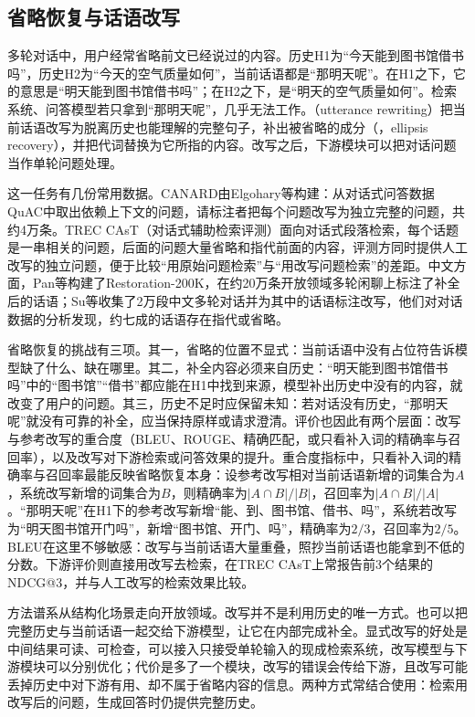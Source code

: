 \subsection{省略恢复与话语改写}
\label{sec:nlp-analysis-utterance-rewriting}

多轮对话中，用户经常省略前文已经说过的内容。历史H1为“今天能到图书馆借书吗”，历史H2为“今天的空气质量如何”，当前话语都是“那明天呢”。在H1之下，它的意思是“明天能到图书馆借书吗”；在H2之下，是“明天的空气质量如何”。检索系统、问答模型若只拿到“那明天呢”，几乎无法工作。（utterance rewriting）把当前话语改写为脱离历史也能理解的完整句子，补出被省略的成分（，ellipsis recovery），并把代词替换为它所指的内容。改写之后，下游模块可以把对话问题当作单轮问题处理。

这一任务有几份常用数据。CANARD由Elgohary等构建：从对话式问答数据QuAC中取出依赖上下文的问题，请标注者把每个问题改写为独立完整的问题，共约4万条。TREC CAsT（对话式辅助检索评测）面向对话式段落检索，每个话题是一串相关的问题，后面的问题大量省略和指代前面的内容，评测方同时提供人工改写的独立问题，便于比较“用原始问题检索”与“用改写问题检索”的差距。中文方面，Pan等构建了Restoration-200K，在约20万条开放领域多轮闲聊上标注了补全后的话语\cite{nlp-analysis-pan2019restoration}；Su等收集了2万段中文多轮对话并为其中的话语标注改写，他们对对话数据的分析发现，约七成的话语存在指代或省略。

省略恢复的挑战有三项。其一，省略的位置不显式：当前话语中没有占位符告诉模型缺了什么、缺在哪里。其二，补全内容必须来自历史：“明天能到图书馆借书吗”中的“图书馆”“借书”都应能在H1中找到来源，模型补出历史中没有的内容，就改变了用户的问题。其三，历史不足时应保留未知：若对话没有历史，“那明天呢”就没有可靠的补全，应当保持原样或请求澄清。评价也因此有两个层面：改写与参考改写的重合度（BLEU、ROUGE、精确匹配，或只看补入词的精确率与召回率），以及改写对下游检索或问答效果的提升。重合度指标中，只看补入词的精确率与召回率最能反映省略恢复本身：设参考改写相对当前话语新增的词集合为$A$，系统改写新增的词集合为$B$，则精确率为$|A\cap B|/|B|$，召回率为$|A\cap B|/|A|$。“那明天呢”在H1下的参考改写新增“能、到、图书馆、借书、吗”，系统若改写为“明天图书馆开门吗”，新增“图书馆、开门、吗”，精确率为$2/3$，召回率为$2/5$。BLEU在这里不够敏感：改写与当前话语大量重叠，照抄当前话语也能拿到不低的分数。下游评价则直接用改写去检索，在TREC CAsT上常报告前3个结果的NDCG@3，并与人工改写的检索效果比较。

方法谱系从结构化场景走向开放领域。改写并不是利用历史的唯一方式。也可以把完整历史与当前话语一起交给下游模型，让它在内部完成补全。显式改写的好处是中间结果可读、可检查，可以接入只接受单轮输入的现成检索系统，改写模型与下游模块可以分别优化；代价是多了一个模块，改写的错误会传给下游，且改写可能丢掉历史中对下游有用、却不属于省略内容的信息。两种方式常结合使用：检索用改写后的问题，生成回答时仍提供完整历史。

